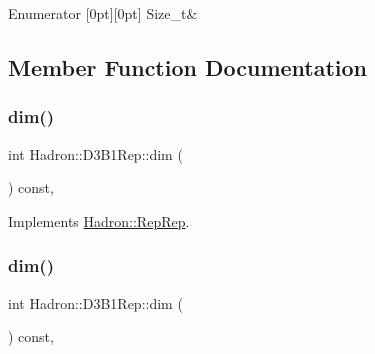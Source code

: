 \begin{DoxyEnumFields}{Enumerator}
[0pt][0pt]{}\mbox{\label{structHadron_1_1D3B1Rep_afd43fba7c8344157f1804ec3b95741daa51cdab27d251fa31de869f956c070090}} 
Size\+\_\+t&\\
\hline

\end{DoxyEnumFields}


\subsection{Member Function Documentation}
\mbox{\label{structHadron_1_1D3B1Rep_ae0ea1d6f2720000159957d1303038399}} 
\subsubsection{\texorpdfstring{dim()}{dim()}\hspace{0.1cm}{\footnotesize\ttfamily [1/3]}}
{\footnotesize\ttfamily int Hadron\+::\+D3\+B1\+Rep\+::dim (\begin{DoxyParamCaption}{ }\end{DoxyParamCaption}) const\hspace{0.3cm}{\ttfamily [inline]}, {\ttfamily [virtual]}}



Implements \mbox{\hyperlink{structHadron_1_1RepRep_a92c8802e5ed7afd7da43ccfd5b7cd92b}{Hadron\+::\+Rep\+Rep}}.

\mbox{\label{structHadron_1_1D3B1Rep_ae0ea1d6f2720000159957d1303038399}} 
\subsubsection{\texorpdfstring{dim()}{dim()}\hspace{0.1cm}{\footnotesize\ttfamily [2/3]}}
{\footnotesize\ttfamily int Hadron\+::\+D3\+B1\+Rep\+::dim (\begin{DoxyParamCaption}{ }\end{DoxyParamCaption}) const\hspace{0.3cm}{\ttfamily [inline]}, {\ttfamily [virtual]}}



